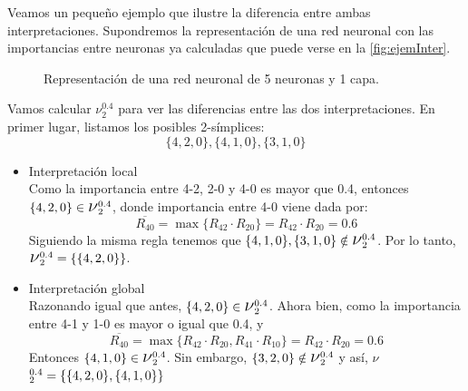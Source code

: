 \documentclass[12pt, a4paper, twoside]{book}
\numberwithin{equation}{section}
\theoremstyle{definition}
\newenvironment{ejem}
  {\pushQED{\qed}\renewcommand{\qedsymbol}{$\blacktriangleleft$}\ejemplo}
  {\popQED\endejemplo}
\theoremstyle{remark}
\theoremstyle{plain}
\begin{document}
	Veamos un pequeño ejemplo que ilustre la diferencia entre ambas 
	interpretaciones.
	\begin{ejem}
		\label{ej:int}
		Supondremos la representación de una red neuronal con 
		las importancias entre neuronas ya calculadas que puede verse 
		en la \autoref{fig:ejemInter}.

		\begin{figure}[!htbp]
			\centering
			\caption{Representación de una red neuronal de 5 neuronas y 1 capa.}
			\label{fig:ejemInter}
		\end{figure}
		Vamos calcular {\Large $\nu$}$^{0.4}_{2}$ para ver las 
		diferencias entre las dos interpretaciones. En primer lugar, 
		listamos los posibles 2-símplices: 
		$$
		\{4,2,0\},\{4,1,0\},\{3,1,0\}
		$$
		\begin{itemize}
			\item{Interpretación local}\\
				Como la importancia entre 4-2, 2-0 y 4-0 es 
				mayor que 0.4, entonces $\{4,2,0\} \in 
				\text{{\Large $\nu$}}^{0.4}_{2}$,
				donde importancia entre 4-0 viene dada por:
				$$\overline{R_{40}}=\max\{R_{42} \cdot 
				R_{20}\}=R_{42} \cdot R_{20}=0.6$$
				Siguiendo la misma regla tenemos que 
				$\{4,1,0\},\{3,1,0\} \notin 
				\text{{\Large $\nu$}}^{0.4}_{2}$. Por lo 
				tanto,
				$\text{{\Large $\nu$}}^{0.4}_{2}=
				\{\{4,2,0\}\}$.
			\item{Interpretación global}\\
				Razonando igual que antes,$\ \{4,2,0\} \in 
				\text{{\Large $\nu$}}^{0.4}_{2}$. Ahora bien, 
				como la importancia entre 4-1 y 1-0 es mayor o 
				igual que 0.4, y 
				$$\overline{R_{40}}=\max\{R_{42} \cdot 
				R_{20},R_{41} \cdot R_{10}\}=R_{42} \cdot 
				R_{20}=0.6$$ 
				Entonces $\{4,1,0\} \in 
				\text{{\Large $\nu$}}^{0.4}_{2}$. Sin embargo, 
				$\{3,2,0\} \notin 
				\text{{\Large $\nu$}}^{0.4}_{2}$ y así, 
				{\Large $\nu$}$^{0.4}_{2}=\{\{4,2,0\},\\  
				\{4,1,0\}\}$
		\end{itemize}
	\end{ejem}
\end{document}

